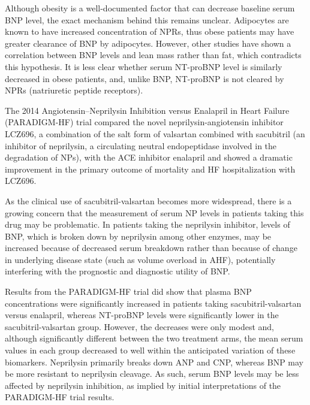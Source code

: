 \documentclass[14pt,a4paper,onecolumn]{extarticle}
\begin{document}
Although obesity is a well-documented factor that can decrease baseline serum BNP level, the exact mechanism behind this remains unclear.  Adipocytes are known to have increased concentration of NPRs, thus obese patients may have greater clearance of BNP by adipocytes. However, other studies have shown a correlation between BNP levels and lean mass rather than fat, which contradicts this hypothesis.  It is less clear whether serum NT-proBNP level is similarly decreased in obese patients, and, unlike BNP, NT-proBNP is not cleared by NPRs (natriuretic peptide receptors). \citep{Maisel2018} %

The 2014 Angiotensin–Neprilysin Inhibition versus Enalapril in Heart Failure (PARADIGM-HF) trial compared the novel neprilysin-angiotensin inhibitor LCZ696, a combination of the salt form of valsartan combined with sacubitril (an inhibitor of neprilysin, a circulating neutral endopeptidase involved in the degradation of NPs), with the ACE inhibitor enalapril and showed a dramatic improvement in the primary outcome of mortality and HF hospitalization with LCZ696. \citep{McMurray2014} %

As the clinical use of sacubitril-valsartan becomes more widespread, there is a growing concern that the measurement of serum NP levels in patients taking this drug may be problematic. In patients taking the neprilysin inhibitor, levels of BNP, which is broken down by neprilysin among other enzymes, may be increased because of decreased serum breakdown rather than because of change in underlying disease state (such as volume overload in AHF), potentially interfering with the prognostic and diagnostic utility of BNP.  \citep{Mckie2016} %

Results from the PARADIGM-HF trial did show that plasma BNP concentrations were significantly increased in patients taking sacubitril-valsartan versus enalapril, whereas NT-proBNP levels were significantly lower in the sacubitril-valsartan group.  However, the decreases were only modest and, although significantly different between the two treatment arms, the mean serum values in each group decreased to well within the anticipated variation of these biomarkers.  Neprilysin primarily breaks down ANP and CNP, whereas BNP may be more resistant to neprilysin cleavage.  As such, serum BNP levels may be less affected by neprilysin inhibition, as implied by initial interpretations of the PARADIGM-HF trial results. \citep{Maisel2018} %
\end{document}
